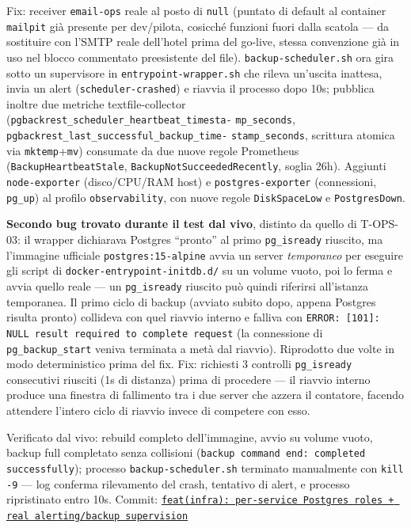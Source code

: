 ﻿\documentclass[a4paper,12pt]{report}
\newcommand{\commitref}[2]{\texttt{\small \href{https://github.com/diegoandruccioli/hotel-pms/commit/#1}{#2}}}
\begin{document}
Fix: receiver \texttt{email-ops} reale al posto di \texttt{null}
(puntato di default al container \texttt{mailpit} già presente per
dev/pilota, cosicché funzioni fuori dalla scatola --- da sostituire con
l'SMTP reale dell'hotel prima del go-live, stessa convenzione già in uso
nel blocco commentato preesistente del file). \texttt{backup-scheduler.sh}
ora gira sotto un supervisore in \texttt{entrypoint-wrapper.sh} che
rileva un'uscita inattesa, invia un alert (\texttt{scheduler-crashed}) e
riavvia il processo dopo 10s; pubblica inoltre due metriche
textfile-collector (\texttt{pgbackrest\_scheduler\_heartbeat\_timesta-}
\texttt{mp\_seconds}, \texttt{pgbackrest\_last\_successful\_backup\_time-}
\texttt{stamp\_seconds}, scrittura atomica via \texttt{mktemp}+\texttt{mv})
consumate da due nuove regole Prometheus (\texttt{BackupHeartbeatStale},
\texttt{BackupNotSucceededRecently}, soglia 26h). Aggiunti
\texttt{node-exporter} (disco/CPU/RAM host) e \texttt{postgres-exporter}
(connessioni, \texttt{pg\_up}) al profilo \texttt{observability}, con
nuove regole \texttt{DiskSpaceLow} e \texttt{PostgresDown}.

\textbf{Secondo bug trovato durante il test dal vivo}, distinto da quello
di T-OPS-03: il wrapper dichiarava Postgres ``pronto'' al primo
\texttt{pg\_isready} riuscito, ma l'immagine ufficiale
\texttt{postgres:15-alpine} avvia un server \emph{temporaneo} per
eseguire gli script di \texttt{docker-entrypoint-initdb.d/} su un volume
vuoto, poi lo ferma e avvia quello reale --- un \texttt{pg\_isready}
riuscito può quindi riferirsi all'istanza temporanea. Il primo ciclo di
backup (avviato subito dopo, appena Postgres risulta pronto) collideva
con quel riavvio interno e falliva con
\texttt{ERROR: [101]: NULL result required to complete request}
(la connessione di \texttt{pg\_backup\_start} veniva terminata a metà dal
riavvio). Riprodotto due volte in modo deterministico prima del fix. Fix:
richiesti 3 controlli \texttt{pg\_isready} consecutivi riusciti (1s di
distanza) prima di procedere --- il riavvio interno produce una finestra
di fallimento tra i due server che azzera il contatore, facendo attendere
l'intero ciclo di riavvio invece di competere con esso.

Verificato dal vivo: rebuild completo dell'immagine, avvio su volume
vuoto, backup full completato senza collisioni
(\texttt{backup command end: completed successfully}); processo
\texttt{backup-scheduler.sh} terminato manualmente con
\texttt{kill -9} --- log conferma rilevamento del crash, tentativo di
alert, e processo ripristinato entro 10s.
Commit: \commitref{5195fd0}{feat(infra): per-service Postgres roles + real alerting/backup supervision}
\end{document}
